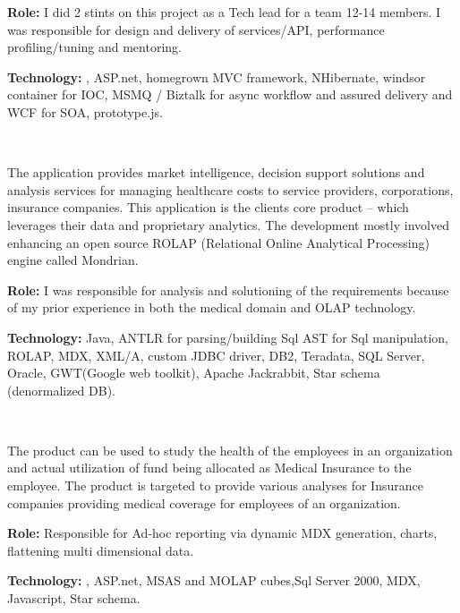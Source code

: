 \begin{resume}
\begin{position}
{\textbf{Role:}} I did 2 stints on this project as a Tech lead for a team 12-14 members. I was responsible for design and delivery of services/API, performance profiling/tuning and mentoring.

{\textbf{Technology:}} \CSharp, ASP.net, homegrown MVC framework, NHibernate,  windsor container for IOC, MSMQ / Biztalk for async workflow and assured delivery and WCF for SOA, prototype.js.
\end{position}\\


\begin{position}
The application provides market intelligence, decision support solutions and analysis services for managing healthcare costs to service providers, corporations, insurance companies. This application is the clients core product – which leverages their data and proprietary analytics. The 
development mostly involved enhancing an open source ROLAP (Relational Online Analytical Processing) engine called Mondrian. 

{\textbf{Role:}} I was responsible for analysis and solutioning of the requirements because of my prior experience in both the medical domain and OLAP technology. 

{\textbf{Technology:}} Java, ANTLR for parsing/building Sql AST for Sql manipulation, ROLAP, MDX, XML/A, custom JDBC driver, DB2, Teradata, SQL Server, Oracle, GWT(Google web toolkit), Apache Jackrabbit, Star schema (denormalized DB).
\end{position}\\

\begin{position}
The product can be used to study the health of the employees in an organization and actual utilization of fund being allocated as Medical Insurance to the employee. The product is targeted to provide various analyses for Insurance companies providing medical coverage for employees of an organization.

{\textbf{Role:}} Responsible for Ad-hoc reporting via dynamic MDX generation, charts, flattening multi dimensional data.

{\textbf{Technology:}} \CSharp, ASP.net, MSAS and MOLAP cubes,Sql Server 2000, MDX, Javascript, Star schema.
\end{position}\\


\end{resume}
